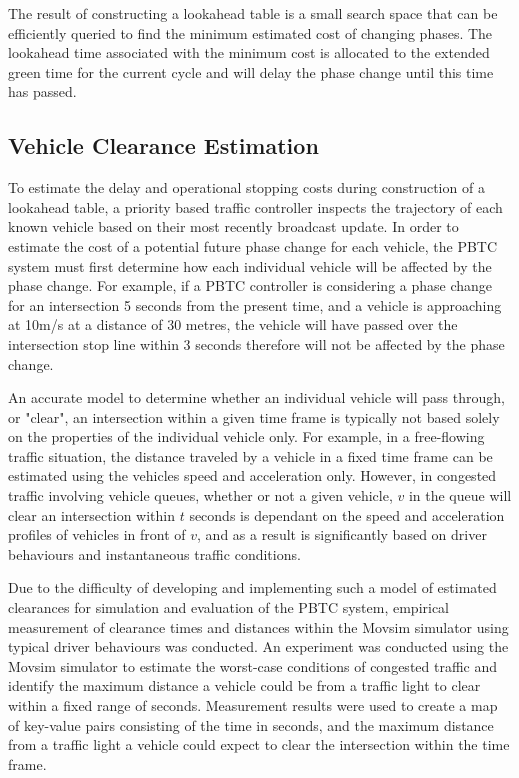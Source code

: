 The result of constructing a lookahead table is a small search space that can be efficiently queried to find the minimum estimated cost of changing phases. The lookahead time associated with the minimum cost is allocated to the extended green time for the current cycle and will delay the phase change until this time has passed.

\subsection{Vehicle Clearance Estimation}

To estimate the delay and operational stopping costs during construction of a lookahead table, a priority based traffic controller inspects the trajectory of each known vehicle based on their most recently broadcast update. In order to estimate the cost of a potential future phase change for each vehicle, the PBTC system must first determine how each individual vehicle will be affected by the phase change. For example, if a PBTC controller is considering a phase change for an intersection 5 seconds from the present time, and a vehicle is approaching at 10m/s at a distance of 30 metres, the vehicle will have passed over the intersection stop line within 3 seconds therefore will not be affected by the phase change. 

An accurate model to determine whether an individual vehicle will pass through, or "clear", an intersection within a given time frame is typically not based solely on the properties of the individual vehicle only. For example, in a free-flowing traffic situation, the distance traveled by a vehicle in a fixed time frame can be estimated using the vehicles speed and acceleration only. However, in congested traffic involving vehicle queues, whether or not a given vehicle, $v$ in the queue will clear an intersection within $t$ seconds is dependant on the speed and acceleration profiles of vehicles in front of $v$, and as a result is significantly based on driver behaviours and instantaneous traffic conditions.

Due to the difficulty of developing and implementing such a model of estimated clearances for simulation and evaluation of the PBTC system, empirical measurement of clearance times and distances within the Movsim simulator using typical driver behaviours was conducted. An experiment was conducted using the Movsim simulator to estimate the worst-case conditions of congested traffic and identify the maximum distance a vehicle could be from a traffic light to clear within a fixed range of seconds. Measurement results were used to create a map of key-value pairs consisting of the time in seconds, and the maximum distance from a traffic light a vehicle could expect to clear the intersection within the time frame.  

